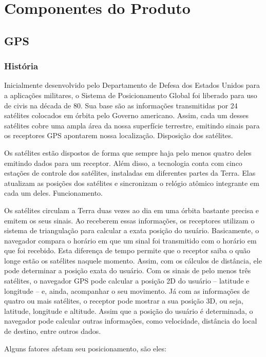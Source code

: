\chapter[Componentes do Produto]{Componentes do Produto}
\section{GPS}
\subsection{História}
	Inicialmente desenvolvido pelo Departamento de Defesa dos Estados Unidos para a aplicações militares, o Sistema de Posicionamento Global foi liberado para uso de civis na década de 80. Sua base são as informações transmitidas por 24 satélites colocados em órbita pelo Governo americano. Assim, cada um desses satélites cobre uma ampla área da nossa superfície terrestre, emitindo sinais para os receptores GPS apontarem nossa localização.
Disposição dos satélites. \cite{Sistema_de_posicionamento_global}

	Os satélites estão dispostos de forma que sempre haja pelo menos quatro deles emitindo dados para um receptor. Além disso, a tecnologia conta com cinco estações de controle dos satélites, instaladas em diferentes partes da Terra. Elas atualizam as posições dos satélites e sincronizam o relógio atômico integrante em cada um deles.
Funcionamento.

Os satélites circulam a Terra duas vezes ao dia em uma órbita bastante precisa e emitem os seus sinais. Ao receberem essas informações, os receptores utilizam o sistema de triangulação para calcular a exata posição do usuário. Basicamente, o navegador compara o horário em que um sinal foi transmitido com o horário em que foi recebido. Esta diferença de tempo permite que o receptor saiba o quão longe estão os satélites naquele momento. Assim, com os cálculos de distância, ele pode determinar a posição exata do usuário. Com os sinais de pelo menos três satélites, o navegador GPS pode calcular a posição 2D do usuário – latitude e longitude – e, ainda, acompanhar o seu movimento. Já com as informações de quatro ou mais satélites, o receptor pode mostrar a sua posição 3D, ou seja, latitude, longitude e altitude. Assim que a posição do usuário é determinada, o navegador pode calcular outras informações, como velocidade, distância do local de destino, entre outros dados.


	Alguns fatores afetam seu posicionamento, são eles:


